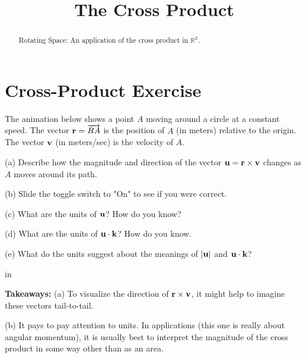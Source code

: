 \documentclass{ximera}
\title{The Cross Product}
\newcommand{\pskip}{\vskip 0.1 in}
\begin{document}
\begin{abstract}
Rotating Space: An application of the cross product in $\mathbb{R}^3$.
\end{abstract}
\maketitle


\section{Cross-Product Exercise}
The animation below shows a point $A$ moving around a circle at a constant speed. The vector ${\bf r} = \overrightarrow{BA}$ is the position of $A$ (in meters) relative to the origin. The vector ${\bf v}$ (in meters/sec) is the velocity of $A$. 

(a) Describe how the magnitude and direction of the vector ${\bf u} = {\bf r}\times {\bf v}$ changes as $A$ moves around its path.

(b) Slide the toggle switch to "On" to see if you were correct.

(c) What are the units of ${\bf u}$? How do you know?

(d) What are the units of ${\bf u} \cdot {\bf k}$? How do you know.

(e) What do the units suggest about the meanings of $|{\bf u}|$ and ${\bf u} \cdot {\bf k}$?

\pskip

{\bf Takeaways:} (a) To visualize the direction of ${\bf r}\times {\bf v}$, it might help to imagine these vectors tail-to-tail.

(b) It pays to pay attention to units. In applications (this one is really about angular momentum), it is usually best to interpret the magnitude of the cross product in some way other than as an area.


\begin{exploration}   \label{Exsd67g:Cross}
 
\begin{onlineOnly}
    \begin{center}
\end{center}
\end{onlineOnly}

\end{exploration}
\end{document}
